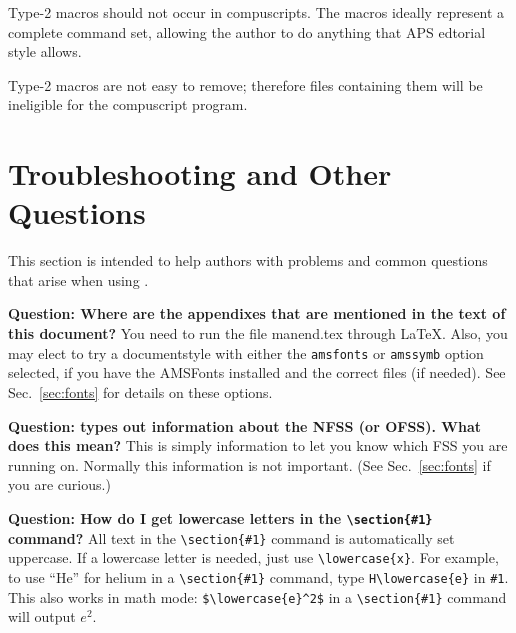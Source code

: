 Type-2 macros should not occur in \REVTeX{} compuscripts. The \REVTeX{}
macros ideally represent a complete command set, allowing the author to do
anything that APS edtorial style allows.

Type-2 macros are not easy to remove;
therefore files containing them will be ineligible for the
compuscript program.

\section{Troubleshooting and Other Questions}

This section is intended to help authors with problems  and common
questions that arise when using \REVTeX{}.

{\bf Question: Where are the appendixes that are mentioned in the text of
this document?} You need to run the file manend.tex through \LaTeX. Also,
you may elect to try a documentstyle with either the \verb+amsfonts+ or
\verb+amssymb+ option selected, if you have the AMSFonts installed and the
correct \AmSLaTeX{} files (if needed). See Sec.\ \ref{sec:fonts} for
details on these options.

{\bf Question: \REVTeX{} types out information about the NFSS (or OFSS).
What does this mean?} This is simply information to let you know which FSS
you are running on. Normally this information is not important. (See Sec.\
\ref{sec:fonts} if you are curious.)


{\bf Question: How do I get lowercase letters in the \verb+\section{#1}+
command?} All text in the \verb+\section{#1}+ command is automatically set
uppercase. If a lowercase letter is needed, just use \verb+\lowercase{x}+.
For example, to use ``He'' for helium in a \verb+\section{#1}+ command,
type \verb+H\lowercase{e}+ in \verb+#1+. This also works in math mode:
\verb+$\lowercase{e}^2$+ in a \verb+\section{#1}+ command will output
$e^2$.

